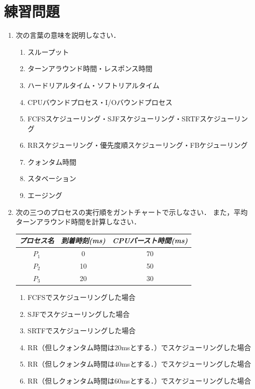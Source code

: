 \section*{練習問題}
\begin{enumerate}
  \renewcommand{\labelenumi}{\ttfamily\arabic{chapter}.\arabic{enumi}}
  \setlength{\leftskip}{1em}
\item 次の言葉の意味を説明しなさい．
  \begin{enumerate}
    \item スループット
    \item ターンアラウンド時間・レスポンス時間
    \item ハードリアルタイム・ソフトリアルタイム
    \item CPUバウンドプロセス・I/Oバウンドプロセス
    \item FCFSスケジューリング・SJFスケジューリング・SRTFスケジューリング
    \item RRスケジューリング・優先度順スケジューリング・FBケジューリング
    \item クォンタム時間
    \item スタベーション
    \item エージング
  \end{enumerate}
\item 次の三つのプロセスの実行順をガントチャートで示しなさい．
  また，平均ターンアラウンド時間を計算しなさい．
  \begin{center}
    \begin{tabular}{c c c}
      \emph{プロセス名} & \emph{到着時刻(ms)} &
      \emph{CPUバースト時間(ms)} \\\hline
      $P_1$  & 0  & 70 \\
      $P_2$  & 10 & 50 \\
      $P_3$  & 20 & 30
    \end{tabular}
  \end{center}
  \begin{enumerate}
    \item FCFSでスケジューリングした場合
    \item SJFでスケジューリングした場合
    \item SRTFでスケジューリングした場合
    \item RR（但しクォンタム時間は20msとする．）でスケジューリングした場合
    \item RR（但しクォンタム時間は40msとする．）でスケジューリングした場合
    \item RR（但しクォンタム時間は60msとする．）でスケジューリングした場合
  \end{enumerate}
\end{enumerate}
